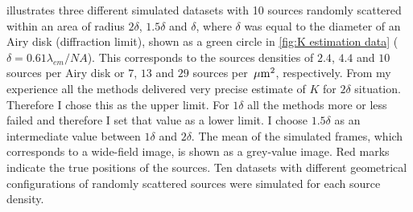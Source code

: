  illustrates three different simulated datasets with 10 sources randomly scattered within an area of radius $2\delta$, $1.5\delta$ and $\delta$, where $\delta$ was equal to the diameter of an Airy disk (diffraction limit), shown as a green circle in \autoref{fig:K estimation data}\ccc{} ($\delta=0.61\lambda_{em}/\unit{NA}$). This corresponds to the sources densities of $2.4$, $4.4$ and $10$ sources per Airy disk or $7$, $13$ and $29$ sources per $\, \mathrm{\mu m}^2$, respectively. From my experience  all the methods delivered very precise estimate of $K$ for $2\delta$ situation. Therefore I chose this as the upper limit. For $1\delta$ all the methods more or less failed and therefore I set that value as a lower limit. I choose $1.5\delta$ as an intermediate value between $1\delta$ and $2\delta$. The mean of the simulated frames, which corresponds to a wide-field image, is shown as a grey-value image. Red marks indicate the true positions of the sources. Ten datasets with different geometrical configurations of randomly scattered sources were simulated for each source density. 

